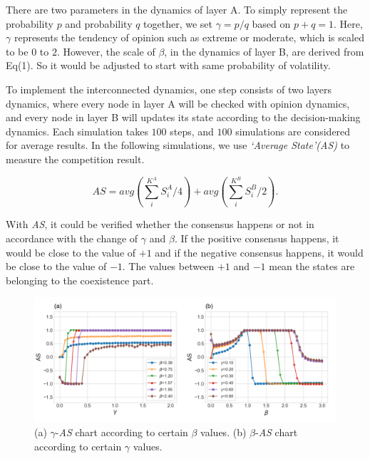 \documentclass[english]{cccconf}
\begin{document}
There are two parameters in the dynamics of layer A. To simply represent the probability $p$ and probability $q$ together, we set $\gamma = p/q$ based on $p+q=1$. Here, $\gamma$ represents the tendency of opinion such as extreme or moderate, which is scaled to be $0$ to $2$. However, the scale of $\beta$, in the dynamics of layer B, are derived from Eq(1). So it would be adjusted to start with same probability of volatility. 

To implement the interconnected dynamics, one step consists of two layers dynamics, where every node in layer A will be checked with opinion dynamics, and every node in layer B will updates its state according to the decision-making dynamics. Each simulation takes $100$ steps, and $100$ simulations are considered for average results. In the following simulations, we use \textit{`Average State'(AS)} to measure the competition result.

\begin{equation}
AS = avg\left( {\sum\limits_i^{{K^A}} {S_i^A/4} } \right) + avg\left( {\sum\limits_i^{{K^B}} {S_i^B/2} } \right).
\end{equation}

With \textit{AS}, it could be verified whether the consensus happens or not in accordance with the change of $\gamma$ and $\beta$.  If the positive consensus happens, it would be close to the value of $+1$ and if the negative consensus happens, it would be close to the value of $-1$. The values between $+1$ and $-1$ mean the states are belonging to the coexistence part.

\begin{figure}[!htb]
	\centering
	\includegraphics[width=\hsize]{FIG2.png}
	\caption{(a) $\gamma$-\textit{AS} chart according to certain $\beta$ values. (b) $\beta$-\textit{AS} chart according to certain $\gamma$ values.}
	\label{Fig2}
\end{figure}
\end{document}
